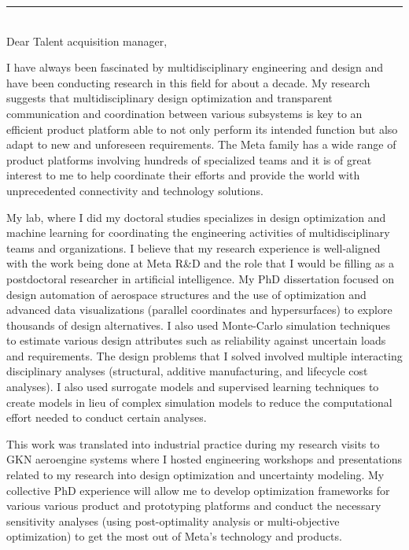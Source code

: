 \documentclass[12pt]{article} %
\begin{document}
\begin{paracol}{2}
\end{paracol}

\medskip %
\rule[0pt]{\textwidth}{1pt}\\

Dear Talent acquisition manager,

\medskip %
I have always been fascinated by multidisciplinary engineering and design and have been conducting research in this field for about a decade. My research suggests that multidisciplinary design optimization and transparent communication and coordination between various subsystems is key to an efficient product platform able to not only perform its intended function but also adapt to new and unforeseen requirements. The Meta family has a wide range of product platforms involving hundreds of specialized teams and it is of great interest to me to help coordinate their efforts and provide the world with unprecedented connectivity and technology solutions.

\medskip %

My lab, where I did my doctoral studies specializes in design optimization and machine learning for coordinating the engineering activities of multidisciplinary teams and organizations. I believe that my research experience is well-aligned with the work being done at Meta R\&D and the role that I would be filling as a postdoctoral researcher in artificial intelligence. My PhD dissertation focused on design automation of aerospace structures and the use of optimization and advanced data visualizations (parallel coordinates and hypersurfaces) to explore thousands of design alternatives. I also used Monte-Carlo simulation techniques to estimate various design attributes such as reliability against uncertain loads and requirements. The design problems that I solved involved multiple interacting disciplinary analyses (structural, additive manufacturing, and lifecycle cost analyses). I also used surrogate models and supervised learning techniques to create models in lieu of complex simulation models to reduce the computational effort needed to conduct certain analyses.

\medskip %

This work was translated into industrial practice during my research visits to GKN aeroengine systems where I hosted engineering workshops and presentations related to my research into design optimization and uncertainty modeling. My collective PhD experience will allow me to develop optimization frameworks for various various product and prototyping platforms and conduct the necessary sensitivity analyses (using post-optimality analysis or multi-objective optimization) to get the most out of Meta's technology and products.
\end{document}
